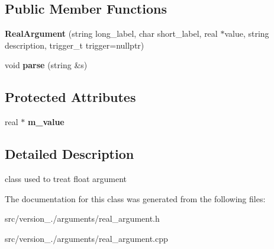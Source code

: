 \subsection*{Public Member Functions}
\begin{DoxyCompactItemize}
\item 
\mbox{\label{classez_1_1arguments_1_1RealArgument_afcf158673a9c16f9e7e9a9715f2c5c91}} 
{\bfseries Real\+Argument} (string long\+\_\+label, char short\+\_\+label, real $\ast$value, string description, trigger\+\_\+t trigger=nullptr)
\item 
\mbox{\label{classez_1_1arguments_1_1RealArgument_a16572490f300eef546feea07761aa1d5}} 
void {\bfseries parse} (string \&s)
\end{DoxyCompactItemize}
\subsection*{Protected Attributes}
\begin{DoxyCompactItemize}
\item 
\mbox{\label{classez_1_1arguments_1_1RealArgument_ac7a7aa8ba9651f9f8fc81d85332cb53c}} 
real $\ast$ {\bfseries m\+\_\+value}
\end{DoxyCompactItemize}


\subsection{Detailed Description}
class used to treat float argument 

The documentation for this class was generated from the following files\+:\begin{DoxyCompactItemize}
\item 
src/version\+\_./arguments/real\+\_\+argument.\+h\item 
src/version\+\_./arguments/real\+\_\+argument.\+cpp\end{DoxyCompactItemize}

